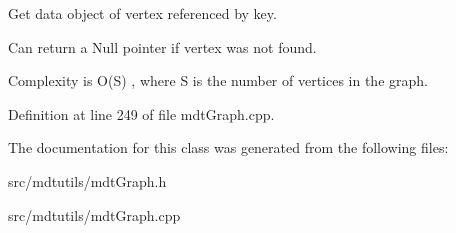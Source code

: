 Get data object of vertex referenced by key. 

Can return a Null pointer if vertex was not found.

Complexity is O(S) , where S is the number of vertices in the graph. 

Definition at line 249 of file mdtGraph.cpp.



The documentation for this class was generated from the following files:\begin{DoxyCompactItemize}
\item 
src/mdtutils/mdtGraph.h\item 
src/mdtutils/mdtGraph.cpp\end{DoxyCompactItemize}
